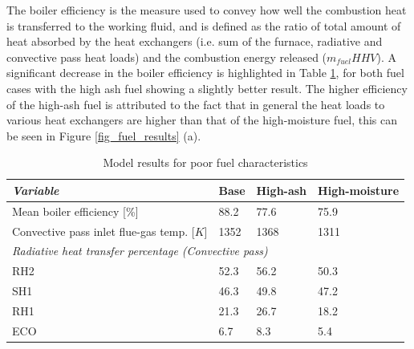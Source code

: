 \documentclass[a4paper,fleqn]{cas-dc}
\begin{document}
The boiler efficiency is the measure used to convey how well the combustion heat is transferred to the working fluid, and is defined as the ratio of total amount of heat absorbed by the heat exchangers (i.e. sum of the furnace, radiative and convective pass heat loads) and the combustion energy released ($m_{fuel}HHV$). A significant decrease in the boiler efficiency is highlighted in Table \ref{tbl_fuel_results}, for both fuel cases with the high ash fuel showing a slightly better result. The higher efficiency of the high-ash fuel is attributed to the fact that in general the heat loads to various heat exchangers are higher than that of the high-moisture fuel, this can be seen in Figure \ref{fig_fuel_results} (a). 

\begin{table}[h!]
\caption{Model results for poor fuel characteristics}\label{tbl_fuel_results}
\begin{tabular*}{\tblwidth}{p{}p{}p{}p{}}
\toprule
\textit{Variable}& Base & High-ash & High-moisture \\ %
\midrule
Mean boiler efficiency [\%]& 88.2 & 77.6 & 75.9\\
Convective pass inlet flue-gas temp. [$K$]& 1352 & 1368 & 1311\\
\midrule
\multicolumn{4}{l}{\textit{Radiative heat transfer percentage (Convective pass)} }\\
\midrule
RH2 & 52.3& 56.2 & 50.3\\
SH1 & 46.3& 49.8& 47.2\\
RH1 & 21.3& 26.7& 18.2\\
ECO & 6.7& 8.3& 5.4\\
\bottomrule
\end{tabular*}
\end{table}  
\end{document}
